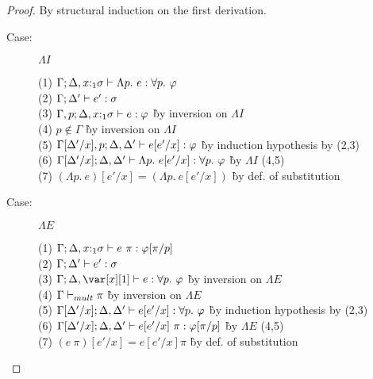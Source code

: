 \linearsubstlemma*



\begin{proof}
By structural induction on the first derivation.

\begin{description}

\item[Case:] $\Lambda I$
\begin{tabbing}
  (1) $\Gamma; \Delta, x{:}_1\sigma \vdash \Lambda p.~e : \forall p.~\varphi$\\
  (2) $\Gamma; \Delta' \vdash e' : \sigma$\\
  (3) $\Gamma, p; \Delta,x{:}_1\sigma \vdash e : \varphi$ \` by inversion on $\Lambda I$\\
  (4) $p \notin \Gamma$ \` by inversion on $\Lambda I$\\
  (5) $\Gamma[\Delta'/x],p; \Delta,\Delta' \vdash e[e'/x] : \varphi$ \` by induction hypothesis by (2,3)\\
  (6) $\Gamma[\Delta'/x];\Delta,\Delta' \vdash \Lambda p.~e[e'/x] : \forall p.~\varphi$ \` by $\Lambda I$ (4,5)\\
  (7) $(\Lambda p.~e)[e'/x] = (\Lambda p.~e[e'/x])$ \` by def. of substitution\\
\end{tabbing}

\item[Case:] $\Lambda E$
\begin{tabbing}
  (1) $\Gamma; \Delta, x{:}_1\sigma \vdash e~\pi: \varphi[\pi/p]$\\
  (2) $\Gamma; \Delta' \vdash e' : \sigma$\\
  (3) $\G; \D, \xl \vdash e : \forall p.~\varphi$ \` by inversion on $\Lambda E$\\
  (4) $\Gamma \vdash_{mult} \pi$ \` by inversion on $\Lambda E$\\
  (5) $\Gamma[\Delta'/x]; \Delta,\Delta' \vdash e[e'/x] : \forall p.~\varphi$ \` by induction hypothesis by (2,3)\\
  (6) $\Gamma[\Delta'/x]; \Delta,\Delta' \vdash e[e'/x]~\pi : \varphi[\pi/p]$ \` by $\Lambda E$ (4,5)\\
  (7) $(e~\pi)[e'/x] = e[e'/x] \pi$ \` by def. of substitution\\
\end{tabbing}


\end{description}
\end{proof}
